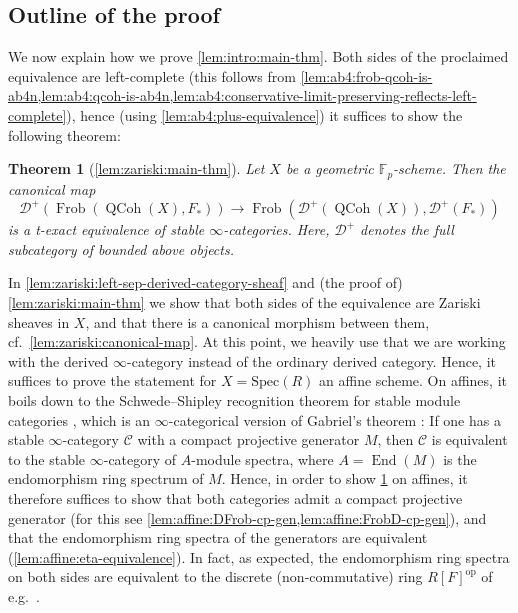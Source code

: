 \documentclass{article}
\theoremstyle{definition}
\theoremstyle{definition}
\theoremstyle{definition}
\theoremstyle{plain}
\theoremstyle{plain}
\theoremstyle{plain}
\theoremstyle{plain}
\theoremstyle{plain}
\theoremstyle{plain}
\theoremstyle{plain}
\theoremstyle{plain}
\theoremstyle{remark}
\theoremstyle{remark}
\theoremstyle{plain}
\newtheorem{introthm}{Theorem}
\theoremstyle{plain}
\theoremstyle{plain}
\theoremstyle{plain}
\theoremstyle{plain}
\newcommand{\Fp}{\mathbb{F}_p}
\newcommand{\op}[1]{#1^{\operatorname{op}}}
\newcommand{\QCoh}[1]{\operatorname{QCoh}(#1)}
\newcommand{\Frob}[2]{\operatorname{Frob}(#1, #2)}
\newcommand{\End}[1]{\operatorname{End}(#1)}
\newcommand{\Cat}[1]{\mathcal{#1}}
\begin{document}
\subsection*{Outline of the proof}
We now explain how we prove \cref{lem:intro:main-thm}.
Both sides of the proclaimed equivalence are left-complete (this follows from \cref{lem:ab4:frob-qcoh-is-ab4n,lem:ab4:qcoh-is-ab4n,lem:ab4:conservative-limit-preserving-reflects-left-complete}),
hence (using \cref{lem:ab4:plus-equivalence}) it suffices to show the following theorem:
\begin{introthm}[{\cref{lem:zariski:main-thm}}] \label{lem:intro:main-thm-plus}
    Let $X$ be a geometric $\Fp$-scheme.
    Then the canonical map 
    \begin{equation*}
        \Cat D^+(\Frob{\QCoh{X}}{F_*}) \to \Frob{\Cat D^+(\QCoh{X})}{\Cat D^+(F_*)}
    \end{equation*}
    is a t-exact equivalence of stable $\infty$-categories.
    Here, $\Cat D^+$ denotes the full subcategory of bounded above objects.
\end{introthm}
In \cref{lem:zariski:left-sep-derived-category-sheaf} and (the proof of) \cref{lem:zariski:main-thm} we show that both sides of the equivalence are Zariski sheaves in $X$,
and that there is a canonical morphism between them, cf.\ \cref{lem:zariski:canonical-map}.
At this point, we heavily use that we are working with the derived $\infty$-category instead of the ordinary derived category.
Hence, it suffices to prove the statement for $X = \mathrm{Spec}(R)$ an affine scheme.
On affines, it boils down to the Schwede--Shipley recognition theorem for stable module categories \cite[Theorem 7.1.2.1]{higheralgebra},
which is an $\infty$-categorical version of Gabriel's theorem \cite[Corollaire V.1.1]{gabriel}:
If one has a stable $\infty$-category $\Cat C$ with a compact projective generator $M$,
then $\Cat C$ is equivalent to the stable $\infty$-category of $A$-module spectra,
where $A = \End{M}$ is the endomorphism ring spectrum of $M$.
Hence, in order to show \cref{lem:intro:main-thm-plus} on affines,
it therefore suffices to show that both categories admit a compact projective generator
(for this see \cref{lem:affine:DFrob-cp-gen,lem:affine:FrobD-cp-gen}),
and that the endomorphism ring spectra of the generators are equivalent (\cref{lem:affine:eta-equivalence}).
In fact, as expected, the endomorphism ring spectra on both sides 
are equivalent to the discrete (non-commutative) ring $\op{R[F]}$ of e.g.\ \cite[Definition 3.2.1]{bockle2014cohomological}.
\end{document}
